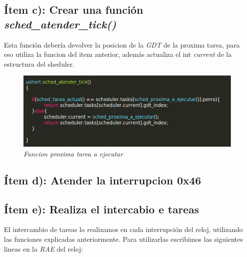 \subsection{Ítem c):  Crear una función \textit{sched\_atender\_tick()}}

Esta función debería devolver la posicion de la \textit{GDT} de la proxima tarea, para eso utiliza la funcion del item anterior, además actualiza el int \textit{current} de la estructura del sheduler. 

\begin{figure}[H]
\begin{center}
  \includegraphics[width=\linewidth]{ejercicio7/atendtick.png}
  \caption{{\small \textit{Funcion proxima tarea a ejecutar }}}
\endminipage
\end{center}
\end{figure}

\subsection{Ítem d):  Atender la interrupcion 0x46}

\subsection{Ítem e):  Realiza el intercabio e tareas}

El intercambio de tareas lo realizamos en cada interrupción del reloj, utilizando las funciones explicadas anteriormente. Para utilizarlas escribimos las siguientes lineas en la \textit{RAE} del reloj:

